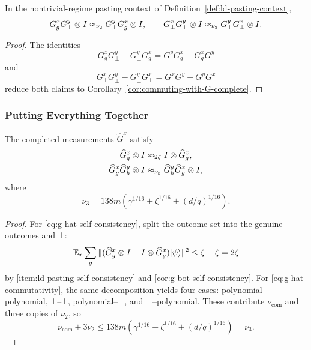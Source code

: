 \begin{corollary}\label{cor:commuting-with-G-incomplete}
	\leanok
	In the nontrivial-regime pasting context of Definition~\ref{def:ld-pasting-context},
	\[
		G_g^x G_\bot^y \otimes I \approx_{\nu_2} G_\bot^y G_g^x \otimes I,
		\qquad
		G_\bot^x G_\bot^y \otimes I \approx_{\nu_2} G_\bot^y G_\bot^x \otimes I.
	\]
\end{corollary}
\begin{proof}
	\leanok
	The identities
	\[
		G_g^x G_\bot^y - G_\bot^y G_g^x = G^y G_g^x - G_g^x G^y
	\]
	and
	\[
		G_\bot^x G_\bot^y - G_\bot^y G_\bot^x = G^x G^y - G^y G^x
	\]
	reduce both claims to Corollary~\ref{cor:commuting-with-G-complete}.
\end{proof}

\subsubsection{Putting Everything Together}

\begin{corollary}\label{cor:G-hat-facts}
	\leanok
	The completed measurements $\widehat G^x$ satisfy
	\begin{align}
		\widehat G_g^x \otimes I                & \approx_{2\zeta} I \otimes \widehat G_g^x, \label{eq:g-hat-self-consistency}           \\
		\widehat G_g^x \widehat G_h^y \otimes I & \approx_{\nu_3} \widehat G_h^y \widehat G_g^x \otimes I, \label{eq:g-hat-commutativity}
	\end{align}
	where
	\[
		\nu_3 = 138m\left(\gamma^{1/16}+\zeta^{1/16}+(d/q)^{1/16}\right).
	\]
\end{corollary}
\begin{proof}
	\leanok
	For \ref{eq:g-hat-self-consistency}, split the outcome set into the genuine outcomes and $\bot$:
	\[
		\mathbb{E}_x \sum_g \|(\widehat G_g^x \otimes I - I \otimes \widehat G_g^x)\lvert \psi \rangle\|^2
		\le \zeta + \zeta = 2\zeta
	\]
	by \ref{item:ld-pasting-self-consistency} and \ref{cor:g-bot-self-consistency}. For \ref{eq:g-hat-commutativity}, the same decomposition yields four cases: polynomial--polynomial, $\bot$--$\bot$, polynomial--$\bot$, and $\bot$--polynomial. These contribute $\nu_{\mathrm{com}}$ and three copies of $\nu_2$, so
	\[
		\nu_{\mathrm{com}} + 3\nu_2
		\le
		138m\left(\gamma^{1/16}+\zeta^{1/16}+(d/q)^{1/16}\right)
		= \nu_3.
	\]
\end{proof}

